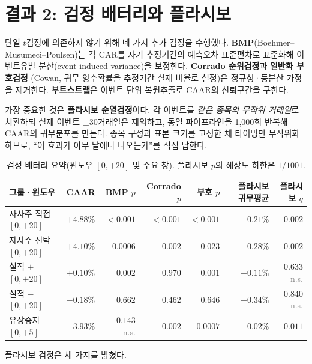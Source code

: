 \documentclass[11pt,a4paper]{article}
\newcommand{\sig}[1]{\textbf{#1}}
\newcommand{\ns}{\textcolor{gray}{n.s.}}
\begin{document}
\section{결과 2: 검정 배터리와 플라시보}

단일 $t$검정에 의존하지 않기 위해 네 가지 추가 검정을 수행했다.
\sig{BMP}(Boehmer--Musumeci--Poulsen)는 각 CAR를 자기 추정기간의 예측오차 표준편차로 표준화해
이벤트유발 분산(event-induced variance)을 보정한다. \sig{Corrado 순위검정}과 \sig{일반화 부호검정}
(Cowan, 귀무 양수확률을 추정기간 실제 비율로 설정)은 정규성·등분산 가정을 제거한다.
\sig{부트스트랩}은 이벤트 단위 복원추출로 CAAR의 신뢰구간을 구한다.

가장 중요한 것은 \sig{플라시보 순열검정}이다. 각 이벤트를 \emph{같은 종목의 무작위 거래일}로
치환하되 실제 이벤트 $\pm30$거래일은 제외하고, 동일 파이프라인을 1{,}000회 반복해 CAAR의
귀무분포를 만든다. 종목 구성과 표본 크기를 고정한 채 타이밍만 무작위화하므로,
``이 효과가 아무 날에나 나오는가''를 직접 답한다.

\begin{table}[htbp]
\centering
\caption{검정 배터리 요약(윈도우 $[0,+20]$ 및 주요 창). 플라시보 $p$의 해상도 하한은 $1/1001$.}
\small
\begin{tabular}{llrrrrr}
\toprule
그룹·윈도우 & CAAR & BMP $p$ & Corrado $p$ & 부호 $p$ & 플라시보 귀무평균 & 플라시보 $q$ \\
\midrule
자사주 직접 $[0,+20]$ & $+4.88\%$ & \sig{$<0.001$} & \sig{$<0.001$} & \sig{$<0.001$} & $-0.21\%$ & \sig{$0.002$} \\
자사주 신탁 $[0,+20]$ & $+4.10\%$ & \sig{$0.0006$} & \sig{$0.002$} & \sig{$0.023$} & $-0.28\%$ & \sig{$0.002$} \\
실적 $+$ $[0,+20]$ & $+0.10\%$ & $0.002$ & $0.970$ & $0.001$ & $+0.11\%$ & $0.633$ \ns \\
실적 $-$ $[0,+20]$ & $-0.18\%$ & $0.662$ & $0.462$ & $0.646$ & $-0.34\%$ & $0.840$ \ns \\
유상증자 $-$ $[0,+5]$ & $-3.93\%$ & $0.143$ \ns & \sig{$0.002$} & \sig{$0.0007$} & $-0.02\%$ & \sig{$0.011$} \\
\bottomrule
\end{tabular}
\end{table}

플라시보 검정은 세 가지를 밝혔다.
\end{document}
